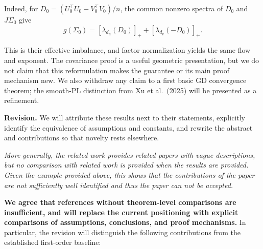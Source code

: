 \documentclass[11pt,a4paper]{article}
\renewenvironment{quote}
  {\par\addvspace{0.8em}\Needspace{8\baselineskip}%
    \list{}{\leftmargin=1.2em\rightmargin=0pt\topsep=0.25em
    \parsep=0.3em}\item\relax\normalsize\itshape\color{quotegray}}
  {\endlist\nopagebreak[4]}
\begin{document}
Indeed, for \(D_0=(U_0^\top U_0-V_0^\top V_0)/n\), the common nonzero spectra of \(D_0\) and \(J\Sigma_0\) give
\[
g(\Sigma_0)=[\lambda_{d_u}(D_0)]_++[\lambda_{d_v}(-D_0)]_+.
\]

This is their effective imbalance, and factor normalization yields the same flow and exponent. The covariance proof is a useful geometric presentation, but we do not claim that this reformulation makes the guarantee or its main proof mechanism new. We also withdraw any claim to a first basic GD convergence theorem; the smooth-PL distinction from Xu et al.~(2025) will be presented as a refinement.

\textbf{Revision.} We will attribute these results next to their statements, explicitly identify the equivalence of assumptions and constants, and rewrite the abstract and contributions so that novelty rests elsewhere.

\begin{quote}
More generally, the related work provides related papers with vague descriptions, but no comparison with related work is provided when the results are provided. Given the example provided above, this shows that the contributions of the paper are not sufficiently well identified and thus the paper can not be accepted.
\end{quote}

\textbf{We agree that references without theorem-level comparisons are insufficient, and will replace the current positioning with explicit comparisons of assumptions, conclusions, and proof mechanisms.} In particular, the revision will distinguish the following contributions from the established first-order baseline:
\end{document}
